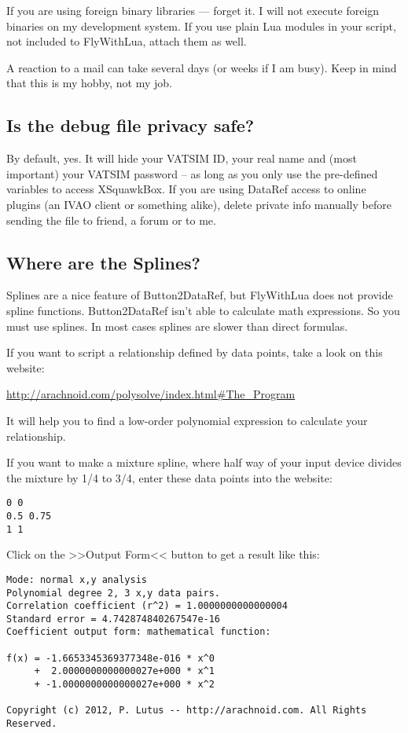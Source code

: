 \documentclass[11pt,parskip=half,a4paper]{scrartcl}
\begin{document}
If you are using foreign binary libraries --- forget it. I will not execute foreign binaries on my development system. If you use plain Lua modules in your script, not included to FlyWithLua, attach them as well.

A reaction to a mail can take several days (or weeks if I am busy). Keep in mind that this is my hobby, not my job.

\subsection{Is the debug file privacy safe?}

By default, yes. It will hide your VATSIM ID, your real name and (most important) your VATSIM password -- as long as you only use the pre-defined variables to access XSquawkBox. If you are using DataRef access to online plugins (an IVAO client or something alike), delete private info manually before sending the file to friend, a forum or to me.

\subsection{Where are the Splines?}

Splines are a nice feature of Button2DataRef, but FlyWithLua does not provide spline functions. Button2DataRef isn't able to calculate math expressions. So you must use splines. In most cases splines are slower than direct formulas.

If you want to script a relationship defined by data points, take a look on this website:

\url{http://arachnoid.com/polysolve/index.html#The_Program}

It will help you to find a low-order polynomial expression to calculate your relationship.

If you want to make a mixture spline, where half way of your input device divides the mixture by 1/4 to 3/4, enter these data points into the website:

\verb|0 0|\\
\verb|0.5 0.75|\\
\verb|1 1|

Click on the >>Output Form<< button to get a result like this:

\begin{lstlisting}[firstnumber=1]
Mode: normal x,y analysis
Polynomial degree 2, 3 x,y data pairs.
Correlation coefficient (r^2) = 1.0000000000000004
Standard error = 4.742874840267547e-16
Coefficient output form: mathematical function:

f(x) = -1.6653345369377348e-016 * x^0
     +  2.0000000000000027e+000 * x^1
     + -1.0000000000000027e+000 * x^2

Copyright (c) 2012, P. Lutus -- http://arachnoid.com. All Rights Reserved.
\end{lstlisting}
\end{document}
